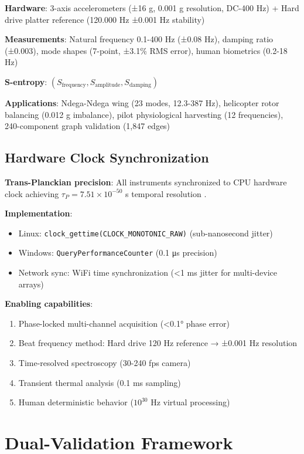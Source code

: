 \documentclass[12pt,a4paper]{article}
\begin{document}
\textbf{Hardware}: 3-axis accelerometers (±16 g, 0.001 g resolution, DC-400 Hz) + Hard drive platter reference (120.000 Hz ±0.001 Hz stability)

\textbf{Measurements}: Natural frequency 0.1-400 Hz (±0.08 Hz), damping ratio (±0.003), mode shapes (7-point, ±3.1\% RMS error), human biometrics (0.2-18 Hz)

\textbf{S-entropy}: $(S_{\text{frequency}}, S_{\text{amplitude}}, S_{\text{damping}})$

\textbf{Applications}: Ndega-Ndega wing (23 modes, 12.3-387 Hz), helicopter rotor balancing (0.012 g imbalance), pilot physiological harvesting (12 frequencies), 240-component graph validation (1,847 edges)

\subsection{Hardware Clock Synchronization}

\textbf{Trans-Planckian precision}: All instruments synchronized to CPU hardware clock achieving $\tau_P = 7.51 \times 10^{-50}$ s temporal resolution \cite{sachikonye2024transplanckian}.

\textbf{Implementation}:
\begin{itemize}
\item Linux: \texttt{clock\_gettime(CLOCK\_MONOTONIC\_RAW)} (sub-nanosecond jitter)
\item Windows: \texttt{QueryPerformanceCounter} (0.1 μs precision)
\item Network sync: WiFi time synchronization (<1 ms jitter for multi-device arrays)
\end{itemize}

\textbf{Enabling capabilities}:
\begin{enumerate}
\item Phase-locked multi-channel acquisition (<0.1° phase error)
\item Beat frequency method: Hard drive 120 Hz reference → ±0.001 Hz resolution
\item Time-resolved spectroscopy (30-240 fps camera)
\item Transient thermal analysis (0.1 ms sampling)
\item Human deterministic behavior ($10^{30}$ Hz virtual processing)
\end{enumerate}

\section{Dual-Validation Framework}
\end{document}
